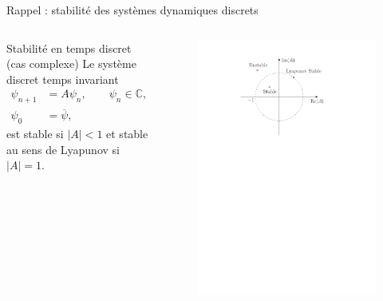 \documentclass[aspectratio=169, french]{beamer}
\begin{document}
\begin{frame}{Rappel : stabilité des systèmes dynamiques discrets}
	\begin{columns}
		\begin{column}{.55\textwidth}
			\begin{block}{Stabilité en temps discret (cas complexe)}
				Le système discret temps invariant
				\begin{equation*}
					\begin{aligned}
						\psi_{n+1} &= A \psi_n, \qquad \psi_n \in \mathbb{C},  \; A \in \mathbb{C},\\
						\psi_0 &= \overline{\psi},
					\end{aligned}
				\end{equation*}  
				est stable si $|A|<1$ et stable au sens de Lyapunov si $|A|=1$.
			\end{block}
		\end{column}
		\begin{column}{.45\textwidth}
			\begin{figure}
				\centering
				\includegraphics[height=.7\textheight]{discrete_stability.pdf}
			\end{figure}
		\end{column}
	\end{columns}	
\end{frame}
\end{document}
